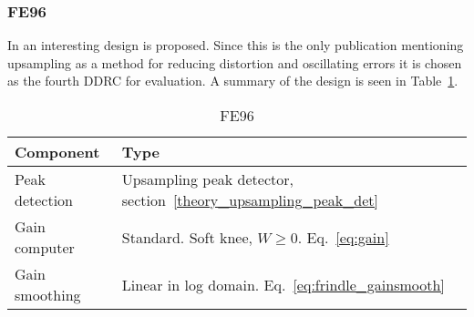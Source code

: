 \documentclass[../main2.tex]{subfiles}
\begin{document}
\subsubsection{FE96}
In \cite{frindl1996dynamic} an interesting design is proposed. Since this is the only publication mentioning upsampling as a method for reducing distortion and oscillating errors it is chosen as the fourth DDRC for evaluation. A summary of the design is seen in Table~\ref{tab:fe96}.
\begin{table}[h]
\begin{center}
\caption{FE96}
\label{tab:fe96}
\begin{tabular}{| l | l |}
	\hline
	Component & Type \\ \hline
	Peak detection & Upsampling peak detector, section~\ref{theory_upsampling_peak_det} \\
	Gain computer & Standard. Soft knee, $W\geq0$. Eq.~\eqref{eq:gain} \\
	Gain smoothing & Linear in log domain. Eq.~\eqref{eq:frindle_gainsmooth} \\
	\hline
\end{tabular}
\end{center}
\end{table}
\end{document}
